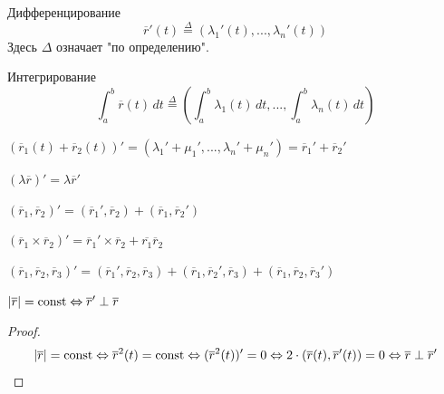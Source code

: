 \begin{Thm}
\begin{MyList}
		\item Дифференцирование
		\[\overline{r}'(t) \stackrel{\Delta}{=}\left(\lambda_1'(t), ..., \lambda_n'(t)\right)\]
		Здесь $\Delta$ означает "по определению".

		\item Интегрирование
		\[\int_a^b \overline{r}(t) \,dt \stackrel{\Delta}{=} \left(\int_a^b \lambda_1(t)\,dt, ..., \int_a^b \lambda_n(t)\,dt\right)\]
	\end{MyList}
\end{Thm}

\begin{Thm}
	\begin{MyList}
		\item $(\overline{r}_1(t) + \overline{r}_2(t))' = (\lambda_1' + \mu_1', ..., \lambda_n' + \mu_n') = \overline{r}_1' + \overline{r}_2'$
		\item $\left(\lambda \overline{r}\right)' = \lambda \overline{r}'$ 
		\item $(\overline{r}_1, \overline{r}_2)' = (\overline{r}_1', \overline{r}_2) + (\overline{r}_1, \overline{r}_2')$
		\item $(\overline{r}_1 \times \overline{r}_2)' = \overline{r}_1' \times \overline{r}_2 + \overline{r_1} \overline{r}_2$
		\item $(\overline{r}_1, \overline{r}_2, \overline{r}_3)' = (\overline{r}_1', \overline{r}_2, \overline{r}_3) + (\overline{r}_1, \overline{r}_2', \overline{r}_3) + (\overline{r}_1, \overline{r}_2, \overline{r}_3')$    
	\end{MyList}
\end{Thm}

\begin{Prop}
	$|\overline{r}| = \operatorname{const} \Leftrightarrow \overline{r}' \perp \overline{r}$
\end{Prop}

\begin{proof}
	\[|\overline{r}| = \operatorname{const} \Leftrightarrow \overline{r}^2(t) = \operatorname{const} \Leftrightarrow (\overline{r}^2(t))' = 0 \Leftrightarrow 2 \cdot (\overline{r}(t), \overline{r}'(t)) = 0 \Leftrightarrow \overline{r} \perp \overline{r}'\]
\end{proof}

